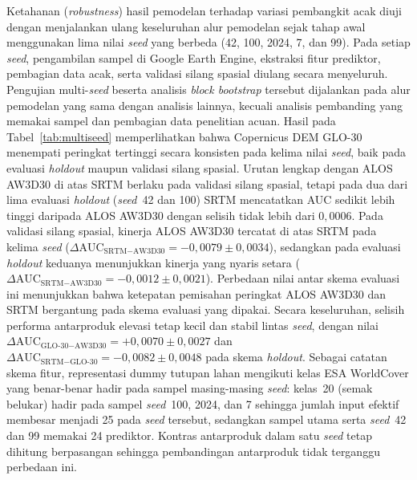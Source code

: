 \documentclass[12pt,a4paper]{article}
\begin{document}
Ketahanan (\textit{robustness}) hasil pemodelan terhadap variasi pembangkit
acak diuji dengan menjalankan ulang keseluruhan alur pemodelan sejak tahap
awal menggunakan lima nilai \textit{seed} yang berbeda (42, 100, 2024, 7, dan
99). Pada setiap \textit{seed}, pengambilan sampel di Google Earth Engine,
ekstraksi fitur prediktor, pembagian data acak, serta validasi silang spasial
diulang secara menyeluruh. Pengujian multi-\textit{seed} beserta analisis
\textit{block bootstrap} tersebut dijalankan pada alur pemodelan yang sama
dengan analisis lainnya, kecuali analisis pembanding yang memakai sampel dan
pembagian data penelitian acuan. Hasil pada Tabel~\ref{tab:multiseed} memperlihatkan bahwa
Copernicus DEM GLO-30 menempati peringkat tertinggi secara konsisten pada
kelima nilai \textit{seed}, baik pada evaluasi \textit{holdout} maupun validasi
silang spasial. Urutan lengkap dengan ALOS AW3D30 di atas SRTM berlaku pada
validasi silang spasial, tetapi pada dua dari lima evaluasi \textit{holdout}
(\textit{seed}~42 dan 100) SRTM mencatatkan AUC sedikit lebih tinggi daripada
ALOS AW3D30 dengan selisih tidak lebih dari $0{,}0006$. Pada validasi silang spasial, kinerja ALOS
AW3D30 tercatat di atas SRTM pada kelima \textit{seed}
($\Delta\text{AUC}_{\text{SRTM}-\text{AW3D30}} = -0{,}0079 \pm 0{,}0034$),
sedangkan pada evaluasi \textit{holdout} keduanya menunjukkan kinerja yang
nyaris setara ($\Delta\text{AUC}_{\text{SRTM}-\text{AW3D30}} = -0{,}0012 \pm
0{,}0021$). Perbedaan nilai antar skema evaluasi ini menunjukkan bahwa ketepatan
pemisahan peringkat ALOS AW3D30 dan SRTM bergantung pada skema evaluasi yang
dipakai. Secara keseluruhan, selisih performa antarproduk elevasi tetap
kecil dan stabil lintas \textit{seed}, dengan nilai
$\Delta\text{AUC}_{\text{GLO-30}-\text{AW3D30}} = +0{,}0070 \pm 0{,}0027$ dan
$\Delta\text{AUC}_{\text{SRTM}-\text{GLO-30}} = -0{,}0082 \pm 0{,}0048$ pada
skema \textit{holdout}. Sebagai catatan skema fitur, representasi dummy tutupan
lahan mengikuti kelas ESA WorldCover yang benar-benar hadir pada sampel
masing-masing \textit{seed}: kelas~20 (semak belukar) hadir pada sampel
\textit{seed}~100, 2024, dan 7 sehingga jumlah input efektif membesar menjadi
25 pada \textit{seed} tersebut, sedangkan sampel utama serta \textit{seed}~42
dan 99 memakai 24 prediktor. Kontras antarproduk dalam satu \textit{seed}
tetap dihitung berpasangan sehingga pembandingan antarproduk tidak terganggu
perbedaan ini.
\end{document}
